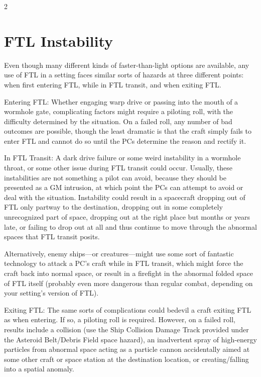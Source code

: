 \begin{multicols}{2}

\chapter{FTL Instability}

Even though many different kinds of faster-than-light options are available, any use of FTL in a setting faces similar sorts of hazards at three different points: when first entering FTL, while in FTL transit, and when exiting FTL.

Entering FTL: Whether engaging warp drive or passing into the mouth of a wormhole gate, complicating factors might require a piloting roll, with the difficulty determined by the situation. On a failed roll, any number of bad outcomes are possible, though the least dramatic is that the craft simply fails to enter FTL and cannot do so until the PCs determine the reason and rectify it.

In FTL Transit: A dark drive failure or some weird instability in a wormhole throat, or some other issue during FTL transit could occur. Usually, these instabilities are not something a pilot can avoid, because they should be presented as a GM intrusion, at which point the PCs can attempt to avoid or deal with the situation.
Instability could result in a spacecraft dropping out of FTL only partway to the destination, dropping out in some completely unrecognized part of space, dropping out at the right place but months or years late, or failing to drop out at all and thus continue to move through the abnormal spaces that FTL transit posits. 

Alternatively, enemy ships—or creatures—might use some sort of fantastic technology to attack a PC’s craft while in FTL transit, which might force the craft back into normal space, or result in a firefight in the abnormal folded space of FTL itself (probably even more dangerous than regular combat, depending on your setting’s version of FTL).

Exiting FTL: The same sorts of complications could bedevil a craft exiting FTL as when entering. If so, a piloting roll is required. However, on a failed roll, results include a collision (use the Ship Collision Damage Track provided under the Asteroid Belt/Debris Field space hazard), an inadvertent spray of high-energy particles from abnormal space acting as a particle cannon accidentally aimed at some other craft or space station at the destination location, or creating/falling into a spatial anomaly.


\end{multicols}
